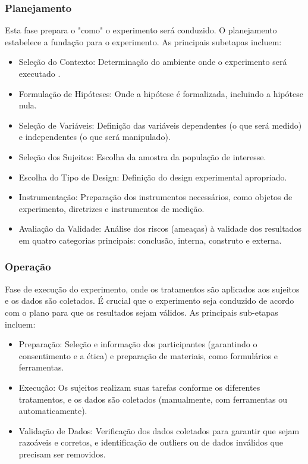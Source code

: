 \subsubsection{Planejamento}
Esta fase prepara o "como" o experimento será conduzido.
O planejamento estabelece a fundação para o experimento.
As principais subetapas incluem:
\begin{itemize}

	\item Seleção do Contexto: Determinação do ambiente onde o experimento será executado . 
	\item Formulação de Hipóteses: Onde a hipótese é formalizada, incluindo a hipótese nula. 
	\item Seleção de Variáveis: Definição das variáveis dependentes (o que será medido) e independentes (o que será manipulado).
	\item Seleção dos Sujeitos: Escolha da amostra da população de interesse.
	\item Escolha do Tipo de Design: Definição do design experimental apropriado.
	\item Instrumentação: Preparação dos instrumentos necessários, como objetos de experimento, diretrizes e instrumentos de medição.
	\item Avaliação da Validade: Análise dos riscos (ameaças) à validade dos resultados em quatro categorias principais: conclusão, interna, construto e externa.

\end{itemize}

\subsubsection{Operação}
Fase de execução do experimento, onde os tratamentos são aplicados aos sujeitos e os dados são coletados.
É crucial que o experimento seja conduzido de acordo com o plano para que os resultados sejam válidos.
As principais sub-etapas incluem:

\begin{itemize}
    \item Preparação: Seleção e informação dos participantes (garantindo o consentimento e a ética) e preparação de materiais, como formulários e ferramentas.
    \item Execução: Os sujeitos realizam suas tarefas conforme os diferentes tratamentos, e os dados são coletados (manualmente, com ferramentas ou automaticamente).
    \item Validação de Dados: Verificação dos dados coletados para garantir que sejam razoáveis e corretos, e identificação de outliers ou 
	de dados inválidos que precisam ser removidos.

\end{itemize}

